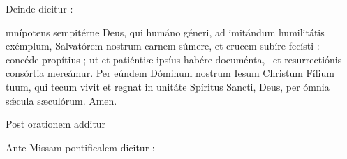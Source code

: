 
\begin{rubric}Deinde dicitur :\end{rubric}



\begin{lectio}mnípotens sempitérne Deus, qui humáno géneri, ad imitándum humilitátis exémplum, Salvatórem nostrum carnem súmere,
et crucem subíre fecísti :~{\gcrux} concéde propítius ; ut et patiéntiæ ipsíus habére documénta,~{\gstella}
et resurrectiónis consórtia mereámur.
Per eúndem Dóminum nostrum Iesum Christum Fílium tuum,
qui tecum vivit et regnat in unitáte Spíritus Sancti, Deus, per ómnia sǽcula sæculórum.
\R Amen.\end{lectio}

\begin{rubric}Post orationem additur\end{rubric}



\pagebreak

\begin{remplacement}Ante Missam pontificalem dicitur :\end{remplacement}




